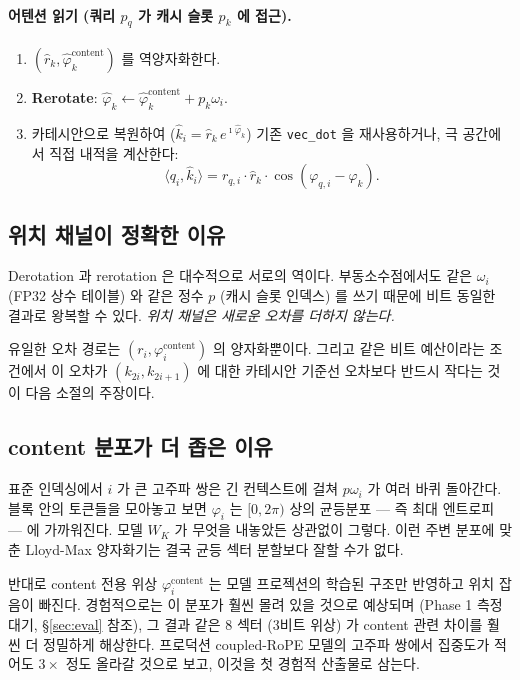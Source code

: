 \documentclass[10pt,twocolumn]{article}
\begin{document}
\paragraph{어텐션 읽기 (쿼리 $p_q$ 가 캐시 슬롯 $p_k$ 에 접근).}
\begin{enumerate}[leftmargin=*,topsep=2pt,itemsep=1pt]
\item $(\hat{r}_k,\hat{\varphi}^{\text{content}}_k)$ 를 역양자화한다.
\item \textbf{Rerotate}: $\hat{\varphi}_k\leftarrow\hat{\varphi}^{\text{content}}_k+p_k\omega_i$.
\item 카테시안으로 복원하여 ($\hat{k}_i=\hat{r}_k\,e^{\imath\hat{\varphi}_k}$) 기존 \texttt{vec\_dot} 을 재사용하거나, 극 공간에서 직접 내적을 계산한다:
\begin{equation}
\langle q_i,\hat{k}_i\rangle
=r_{q,i}\cdot\hat{r}_k\cdot\cos(\varphi_{q,i}-\hat{\varphi}_k).
\label{eq:polar-dot}
\end{equation}
\end{enumerate}

\subsection{위치 채널이 정확한 이유}
\label{sec:exact}

Derotation 과 rerotation 은 대수적으로 서로의 역이다. 부동소수점에서도 같은 $\omega_i$ (FP32 상수 테이블) 와 같은 정수 $p$ (캐시 슬롯 인덱스) 를 쓰기 때문에 비트 동일한 결과로 왕복할 수 있다. \emph{위치 채널은 새로운 오차를 더하지 않는다.}

유일한 오차 경로는 $(r_i,\varphi^{\text{content}}_i)$ 의 양자화뿐이다. 그리고 같은 비트 예산이라는 조건에서 이 오차가 $(k_{2i},k_{2i+1})$ 에 대한 카테시안 기준선 오차보다 반드시 작다는 것이 다음 소절의 주장이다.

\subsection{content 분포가 더 좁은 이유}
\label{sec:tighter}

표준 인덱싱에서 $i$ 가 큰 고주파 쌍은 긴 컨텍스트에 걸쳐 $p\omega_i$ 가 여러 바퀴 돌아간다. 블록 안의 토큰들을 모아놓고 보면 $\varphi_i$ 는 $[0,2\pi)$ 상의 균등분포 --- 즉 최대 엔트로피 --- 에 가까워진다. 모델 $W_K$ 가 무엇을 내놓았든 상관없이 그렇다. 이런 주변 분포에 맞춘 Lloyd-Max 양자화기는 결국 균등 섹터 분할보다 잘할 수가 없다.

반대로 content 전용 위상 $\varphi^{\text{content}}_i$ 는 모델 프로젝션의 학습된 구조만 반영하고 위치 잡음이 빠진다. 경험적으로는 이 분포가 훨씬 몰려 있을 것으로 예상되며 (Phase 1 측정 대기, \S\ref{sec:eval} 참조), 그 결과 같은 8 섹터 (3비트 위상) 가 content 관련 차이를 훨씬 더 정밀하게 해상한다. 프로덕션 coupled-RoPE 모델의 고주파 쌍에서 집중도가 적어도 $3\times$ 정도 올라갈 것으로 보고, 이것을 첫 경험적 산출물로 삼는다.
\end{document}

